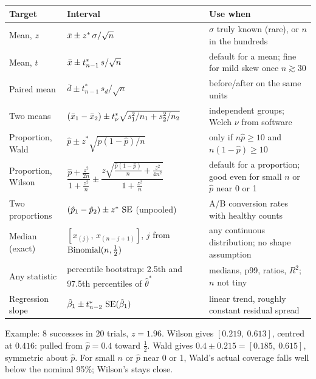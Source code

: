 \begin{center}
\small
\renewcommand{\arraystretch}{1.45}
\begin{tabular}{@{}p{2.9cm}p{6.1cm}p{5.6cm}@{}}
\toprule
Target & Interval & Use when \\
\midrule
Mean, $z$ & $\bar{x}\pm z^*\,\sigma/\sqrt n$ & $\sigma$ truly known (rare), or $n$ in the hundreds \\
Mean, $t$ & $\bar{x}\pm t^*_{n-1}\,s/\sqrt n$ & default for a mean; fine for mild skew once $n\gtrsim 30$ \\
Paired mean & $\bar d\pm t^*_{n-1}\,s_d/\sqrt n$ & before/after on the same units \\
Two means & $(\bar{x}_1-\bar{x}_2)\pm t^*_{\nu}\sqrt{s_1^2/n_1+s_2^2/n_2}$ & independent groups; Welch $\nu$ from software \\
Proportion, Wald & $\hat p\pm z^*\sqrt{\hat p(1-\hat p)/n}$ & only if $n\hat p\ge 10$ and $n(1-\hat p)\ge 10$ \\
Proportion, Wilson & $\dfrac{\hat p+\frac{z^2}{2n}}{1+\frac{z^2}{n}}\pm\dfrac{z\sqrt{\frac{\hat p(1-\hat p)}{n}+\frac{z^2}{4n^2}}}{1+\frac{z^2}{n}}$ & default for a proportion; good even for small $n$ or $\hat p$ near 0 or 1 \\
Two proportions & $(\hat p_1-\hat p_2)\pm z^*\,\operatorname{SE}$ (unpooled) & A/B conversion rates with healthy counts \\
Median (exact) & $[x_{(j)},\,x_{(n-j+1)}]$, $j$ from $\operatorname{Binomial}(n,\tfrac12)$ & any continuous distribution; no shape assumption \\
Any statistic & percentile bootstrap: 2.5th and 97.5th percentiles of $\hat\theta^*$ & medians, p99, ratios, $R^2$; $n$ not tiny \\
Regression slope & $\hat\beta_1\pm t^*_{n-2}\,\operatorname{SE}(\hat\beta_1)$ & linear trend, roughly constant residual spread \\
\bottomrule
\end{tabular}
\end{center}

Example: $8$ successes in $20$ trials, $z=1.96$. Wilson gives $[0.219,\ 0.613]$, centred at $0.416$: pulled from $\hat p=0.4$ toward $\tfrac12$. Wald gives $0.4\pm 0.215=[0.185,\ 0.615]$, symmetric about $\hat p$. For small $n$ or $\hat p$ near 0 or 1, Wald's actual coverage falls well below the nominal 95\%; Wilson's stays close.


